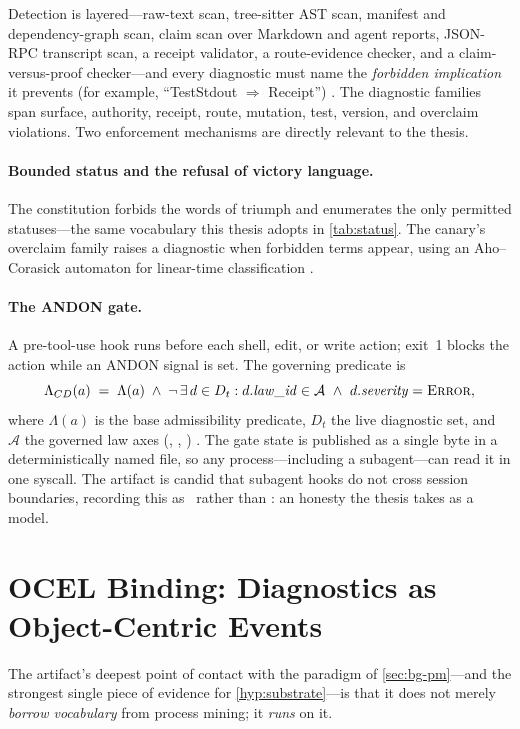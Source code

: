 Detection is layered---raw-text scan, tree-sitter AST scan, manifest and
dependency-graph scan, claim scan over Markdown and agent reports, JSON-RPC
transcript scan, a receipt validator, a route-evidence checker, and a
claim-versus-proof checker---and every diagnostic must name the \emph{forbidden
implication} it prevents (for example, ``TestStdout $\Rightarrow$ Receipt'')
\citep{lspmax}. The diagnostic families span surface, authority, receipt, route,
mutation, test, version, and overclaim violations. Two enforcement mechanisms are
directly relevant to the thesis.

\paragraph{Bounded status and the refusal of victory language.} The constitution
forbids the words of triumph and enumerates the only permitted statuses---the
same vocabulary this thesis adopts in \cref{tab:status}. The canary's
overclaim family raises a diagnostic when forbidden terms appear, using an
Aho--Corasick automaton for linear-time classification \citep{lspmax}.

\paragraph{The ANDON gate.} A pre-tool-use hook runs  before each shell, edit, or write action; exit~1 blocks the action while an
ANDON signal is set. The governing predicate is
\[
  \Lambda_{CD}(a) \;=\; \Lambda(a)\;\wedge\;\neg\,\exists\, d \in D_t :
  d.\mathit{law\_id} \in \mathcal{A}\ \wedge\ d.\mathit{severity}=\textsc{Error},
\]
where $\Lambda(a)$ is the base admissibility predicate, $D_t$ the live diagnostic
set, and $\mathcal{A}$ the governed law axes (, ,
) \citep{lspmax}. The gate state is published as a single byte in a
deterministically named file, so any process---including a subagent---can read it
in one syscall. The artifact is candid that subagent hooks do not cross session
boundaries, recording this as \openstat\ rather than \admitted: an honesty the
thesis takes as a model.

\section{OCEL Binding: Diagnostics as Object-Centric Events}
\label{sec:art-ocel}

The artifact's deepest point of contact with the paradigm of
\cref{sec:bg-pm}---and the strongest single piece of evidence for
\cref{hyp:substrate}---is that it does not merely \emph{borrow vocabulary} from
process mining; it \emph{runs} on it.

